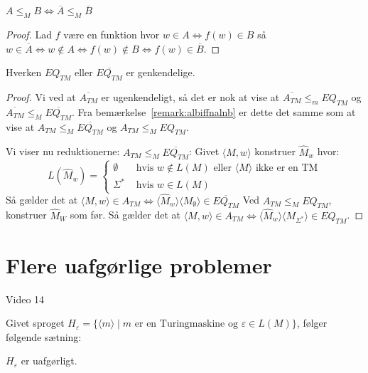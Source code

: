 \begin{remark}
	\label{remark:albiffnalnb}
	$A \le_{M} B \iff \overline{A} \le_{M} \overline{B}$
\end{remark}
\begin{proof}
	Lad $f$ være en funktion hvor $w \in A \iff f(w) \in B$ så $w \in \overline{A} \iff w \notin A \iff f(w) \notin B \iff f(w) \in \overline{B}$.
\end{proof}
\begin{theorem}
	Hverken $EQ_{TM}$ eller $\overline{EQ_{TM}}$ er genkendelige.
\end{theorem}
\begin{proof}
	Vi ved at $\overline{A_{TM}}$ er ugenkendeligt, så det er nok at vise at $\overline{A_{TM}} \le_{m} EQ_{TM}$ og $\overline{A_{TM}} \le_{M} \overline{EQ_{TM}}$. Fra bemærkelse~\ref{remark:albiffnalnb} er dette det samme som at vise at $A_{TM} \le_{M} \overline{EQ_{TM}}$ og $A_{TM} \le_{M} EQ_{TM}$.

	Vi viser nu reduktionerne:
	$A_{TM} \le_{M} \overline{EQ_{TM}}$: Givet \(\langle M , w \rangle \) konstruer $\hat{M}_{w}$ hvor:
	\begin{equation*}
		L(\hat{M}_{w}) = \begin{cases}
			\emptyset  & \text{ hvis } w \notin L(M) \text{ eller } \langle M \rangle \text{ ikke er en TM} \\
			\Sigma^{*} & \text{ hvis } w \in L(M)
		\end{cases}
	\end{equation*}
	Så gælder det at \(\langle M, w \rangle \in A_{TM} \iff \langle \hat{M}_{w} \rangle \langle M_{\emptyset} \rangle \in \overline{EQ_{TM}} \)
	Ved $A_{TM} \le_{M} EQ_{TM}$, konstruer $\hat{M}_{W}$ som før. Så gælder det at $\langle M , w \rangle \in A_{TM} \iff \langle \hat{M}_{w} \rangle \langle M_{\Sigma^{*}} \rangle \in EQ_{TM}$.
\end{proof}

\section{Flere uafgørlige problemer}%
\label{sec:label}

\begin{note}[Kilder]
	Video 14
\end{note}

Givet sproget $H_{\varepsilon} = \{ \langle m \rangle  \mid m \text{ er en Turingmaskine og } \varepsilon \in L(M)\}$, følger følgende sætning:

\begin{theorem}
	$H_{\varepsilon}$ er uafgørligt.
\end{theorem}

